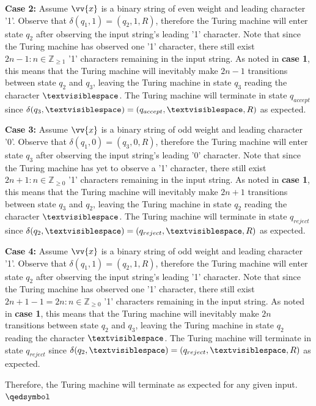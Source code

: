 \documentclass{article}
\begin{document}
\begin{prf}
\begin{adjustwidth}{0.5cm}{}
	\textbf{Case 2:} Assume $\vv{x}$ is a binary string of even weight and leading character '1'.  Observe that $\delta(q_{1}, 1) = (q_{2}, 1, R)$, therefore the Turing machine will enter state $q_{2}$ after observing the input string's leading '1' character.  Note that since the Turing machine has observed one '1' character, there still exist $2n - 1 : n \in \mathbb{Z}_{\geq 1}$ '1' characters remaining in the input string.  As noted in \textbf{case 1}, this means that the Turing machine will inevitably make $2n - 1$ transitions between state $q_{2}$ and $q_{3}$, leaving the Turing machine in state $q_{3}$ reading the character $\textvisiblespace$.  The Turing machine will terminate in state $q_{accept}$ since $\delta(q_{3}, \textvisiblespace) = (q_{accept}, \textvisiblespace, R)$ as expected.\\
\end{adjustwidth}
\begin{adjustwidth}{0.5cm}{}
	\textbf{Case 3:} Assume $\vv{x}$ is a binary string of odd weight and leading character '0'.  Observe that $\delta(q_{1}, 0) = (q_{3}, 0, R)$, therefore the Turing machine will enter state $q_{3}$ after observing the input string's leading '0' character.  Note that since the Turing machine has yet to observe a '1' character, there still exist $2n + 1 : n \in \mathbb{Z}_{\geq 0}$ '1' characters remaining in the input string.  As noted in \textbf{case 1}, this means that the Turing machine will inevitably make $2n + 1$ transitions between state $q_{3}$ and $q_{2}$, leaving the Turing machine in state $q_{2}$ reading the character $\textvisiblespace$.  The Turing machine will terminate in state $q_{reject}$ since $\delta(q_{2}, \textvisiblespace) = (q_{reject}, \textvisiblespace, R)$ as expected.\\
\end{adjustwidth}
\begin{adjustwidth}{0.5cm}{}
	\textbf{Case 4:} Assume $\vv{x}$ is a binary string of odd weight and leading character '1'.  Observe that $\delta(q_{1}, 1) = (q_{2}, 1, R)$, therefore the Turing machine will enter state $q_{2}$ after observing the input string's leading '1' character.  Note that since the Turing machine has observed one '1' character, there still exist $2n + 1 - 1 = 2n : n \in \mathbb{Z}_{\geq 0}$ '1' characters remaining in the input string.  As noted in \textbf{case 1}, this means that the Turing machine will inevitably make $2n$ transitions between state $q_{2}$ and $q_{3}$, leaving the Turing machine in state $q_{2}$ reading the character $\textvisiblespace$.  The Turing machine will terminate in state $q_{reject}$ since $\delta(q_{2}, \textvisiblespace) = (q_{reject}, \textvisiblespace, R)$ as expected. \\
\end{adjustwidth}
	\noindent Therefore, the Turing machine will terminate as expected for any given input. $\qedsymbol$
\end{prf}
\end{document}
